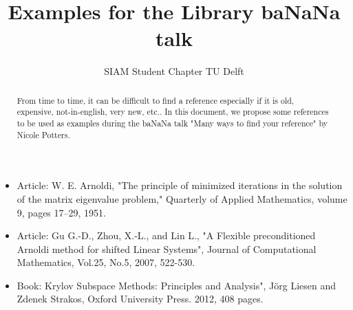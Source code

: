 \documentclass[a4paper,10pt]{article}
\title{Examples for the Library baNaNa talk}
\author{SIAM Student Chapter TU Delft}
\begin{document}
\maketitle

\begin{abstract}
From time to time, it can be difficult to find a reference especially if it is old, expensive, not-in-english, very new, etc..
In this document, we propose some references to be used as examples during the baNaNa talk "Many ways to find your reference" by Nicole Potters.
\end{abstract}
\begin{itemize}
 \item Article: W. E. Arnoldi, "The principle of minimized iterations in the solution of the matrix eigenvalue problem," Quarterly of Applied Mathematics, volume 9, pages 17--29, 1951.
\item Article: Gu G.-D., Zhou, X.-L., and Lin L., "A Flexible preconditioned Arnoldi method for shifted Linear Systems", Journal of Computational Mathematics, Vol.25, No.5, 2007, 522-530.
\item Book: Krylov Subspace Methods: Principles and Analysis", J\"{o}rg Liesen and Zdenek Strakos, Oxford University Press. 2012, 408 pages.

 \end{itemize}
\end{document}
